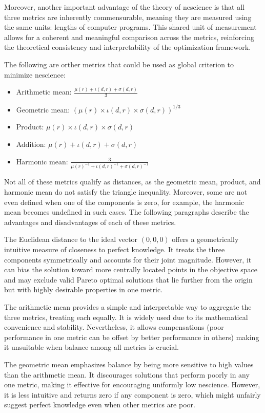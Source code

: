 Moreover, another important advantage of the theory of nescience is that all three metrics are inherently commensurable, meaning they are measured using the same units: lengths of computer programs. This shared unit of measurement allows for a coherent and meaningful comparison across the metrics, reinforcing the theoretical consistency and interpretability of the optimization framework.

The following are orther metrics that could be used as global criterion to minimize nescience:

\begin{itemize}
\item Arithmetic mean: $\frac{\mu(r) + \iota(d, r) + \sigma(d, r)}{3}$
\item Geometric mean: $\left( \mu(r) \times \iota(d, r) \times \sigma(d, r) \right)^{1/3}$
\item Product: $\mu(r) \times \iota(d, r) \times \sigma(d, r)$
\item Addition: $\mu(r) + \iota(d, r) + \sigma(d, r)$
\item Harmonic mean: $\frac{3}{ \mu(r)^{-1} + \iota(d, r)^{-1} + \sigma(d, r)^{-1} }$
\end{itemize}

Not all of these metrics qualify as distances, as the geometric mean, product, and harmonic mean do not satisfy the triangle inequality. Moreover, some are not even defined when one of the components is zero, for example, the harmonic mean becomes undefined in such cases. The following paragraphs describe the advantages and disadvantages of each of these metrics.

The Euclidean distance to the ideal vector $(0,0,0)$ offers a geometrically intuitive measure of closeness to perfect knowledge. It treats the three components symmetrically and accounts for their joint magnitude. However, it can bias the solution toward more centrally located points in the objective space and may exclude valid Pareto optimal solutions that lie further from the origin but with highly desirable properties in one metric.

The arithmetic mean provides a simple and interpretable way to aggregate the three metrics, treating each equally. It is widely used due to its mathematical convenience and stability. Nevertheless, it allows compensations (poor performance in one metric can be offset by better performance in others) making it unsuitable when balance among all metrics is crucial.

The geometric mean emphasizes balance by being more sensitive to high values than the arithmetic mean. It discourages solutions that perform poorly in any one metric, making it effective for encouraging uniformly low nescience. However, it is less intuitive and returns zero if any component is zero, which might unfairly suggest perfect knowledge even when other metrics are poor.

